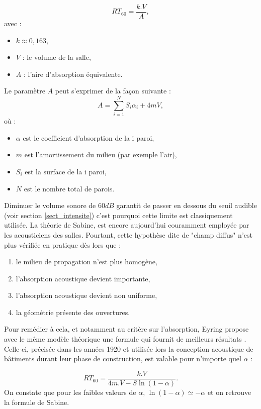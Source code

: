 \begin{equation}
   	RT_{60} = \frac{k.V}{A},
\end{equation}
avec :
\begin{itemize}
\item $k \approx 0,163$,
\item $V$ : le volume de la salle,
\item $A$ : l'aire d'absorption équivalente.
\end{itemize}
%
Le paramètre $A$ peut s'exprimer de la façon suivante :
\begin{equation*}
   	A = \sum_{i=1}^N S_{i}\alpha_{i} + 4mV,
\end{equation*}
où :
\begin{itemize}
\item $\alpha$ est le coefficient d'absorption de la i paroi,
\item $m$ est l'amortissement du milieu (par exemple l'air),
\item $S_{i}$ est la surface de la i paroi,
\item $N$ est le nombre total de parois.
\end{itemize}
%
Diminuer le volume sonore de $60dB$ garantit de passer en dessous du seuil audible (voir section \ref{sect_intensite}) c'est pourquoi cette limite est classiquement utilisée. La théorie de Sabine, est encore aujourd'hui couramment employée par les acousticiens des salles. Pourtant, cette hypothèse dite de "champ diffus" n’est plus vérifiée en pratique dès lors que :
\begin{enumerate}
\item le milieu de propagation n’est plus homogène,
\item l’absorption acoustique devient importante,
\item l’absorption acoustique devient non uniforme,
\item la géométrie présente des ouvertures.
\end{enumerate}
Pour remédier à cela, et notamment au critère sur l'absorption, Eyring propose avec le même modèle théorique une formule qui fournit de meilleurs résultats \cite[p. 217-241]{eyring}. Celle-ci, précisée dans les années 1920 et utilisée lors la conception acoustique de bâtiments durant leur phase de construction, est valable pour n'importe quel $\alpha$ :

\begin{equation}
   	RT_{60} = \frac{k.V}{4m.V - S\ln{(1-\alpha)}}.
\end{equation}
%
On constate que pour les faibles valeurs de $\alpha$, $\ln{(1-\alpha)} \simeq -\alpha$ et on retrouve la formule de Sabine.
 
